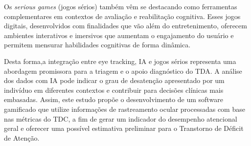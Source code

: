 Os \textit{serious games} (jogos sérios) também vêm se destacando como ferramentas complementares em contextos de avaliação e reabilitação cognitiva. Esses jogos digitais, desenvolvidos com finalidades que vão além do entretenimento, oferecem ambientes interativos e imersivos que aumentam o engajamento do usuário e permitem mensurar habilidades cognitivas de forma dinâmica.

Desta forma,a integração entre eye tracking, IA e jogos sérios representa uma abordagem promissora para a triagem e o apoio diagnóstico do TDA.
A análise dos dados com IA pode indicar o grau de
desatenção apresentado por um indivíduo em diferentes contextos e contribuir para decisões
clínicas mais embasadas. Assim, este estudo propõe o desenvolvimento de um software gamificado que utilize informações de rastreamento ocular processadas com base nas métricas do TDC, a fim de gerar um indicador do desempenho atencional geral e oferecer uma possível estimativa preliminar para o Transtorno de Déficit de Atenção.